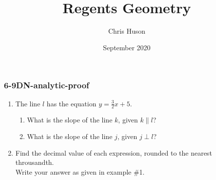 \documentclass[12pt, twoside]{article}
\title{Regents Geometry}
\author{Chris Huson}
\date{September 2020}
\begin{document}
\subsubsection*{6-9DN-analytic-proof}
\begin{enumerate}
\item The line $l$ has the equation $y=\frac{3}{2}x+5$.
    \begin{enumerate}
      \item What is the slope of the line $k$, given $k \parallel l$?
      \vspace{0.5cm}
      \item What is the slope of the line $j$, given $j \perp l$?
      \vspace{0.5cm}
    \end{enumerate}

\item Find the decimal value of each expression, rounded to the nearest throusandth. \\[0.25cm]
  Write your answer as given in example \#1.
    \begin{enumerate}
    \end{enumerate}
    \vspace{1.5cm}


\end{enumerate}
\end{document}
